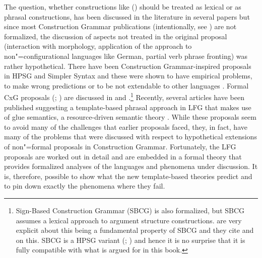 The question, whether constructions like () should be treated as lexical or as
phrasal constructions, has been discussed in the literature in several papers
\citep{GJ2004a,Mueller2006d,Goldberg2013b,MWArgSt} but since most Construction Grammar publications
(intentionally, see ) are not formalized, the discussion of aspects not treated
in the original proposal (\eg interaction with morphology, application of the approach to
non"=configurational languages like German, partial verb phrase fronting) was rather
hypothetical. There have been Construction Grammar-inspired proposals in HPSG
\citep{Haugereid2007a,Haugereid2009a} and Simpler Syntax \citep{CJ2005a} and these were shown to
have empirical problems, to make wrong predictions or to be not extendable to other languages
\citep{MuellerUnifying,MuellerGT-Eng1}. Formal CxG proposals (\citealp{BC2005a};
\citealp{vanTrijp2011a}) are discussed in  and
.\footnote{%
  Sign-Based Construction Grammar (SBCG) is also formalized, but SBCG assumes a lexical approach to
  argument structure constructions. \citet*{SBK2012a} are very explicit about this being a
  fundamental property of SBCG and they cite  and  on
  this. SBCG is a HPSG variant (; ) and
  hence it is no surprise that it is fully compatible with what is argued for in this book.
} Recently, several articles
have been published suggesting a template-based phrasal approach in LFG that makes use of glue semantics, a resource-driven semantic
theory \citep*{Christie2010a,AGT2014a}. While these proposals seem to avoid many of the challenges
that earlier proposals faced, they, in fact, have many of the problems that were discussed with respect
to hypothetical extensions of non"=formal proposals in Construction Grammar. Fortunately, the LFG proposals are worked out in
detail and are embedded in a formal theory that provides formalized analyses of the languages and
phenomena under discussion. It is, therefore, possible to show what the new template-based theories
predict and to pin down exactly the phenomena where they fail. 

